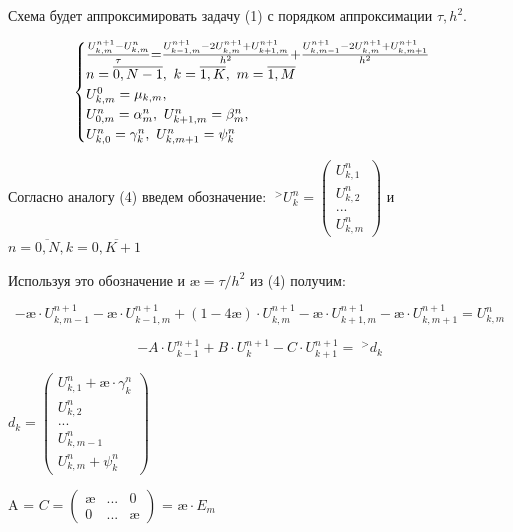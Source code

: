 \documentclass[__main__.tex]{subfiles}
\begin{document}
Схема будет аппроксимировать задачу (1) с порядком аппроксимации $ \tau, h^2 $.

\begin{equation} \label{50.4}
\begin{cases}
$$\frac{U^{n+1}_{k,m} - U^{n}_{k,m}}{\tau}$$ = $$\frac{U^{n+1}_{k-1,m} - 2U^{n+1}_{k,m} + U^{n+1}_{k+1,m}}{h^2}$$ + $$\frac{U^{n+1}_{k,m-1} - 2U^{n+1}_{k,m} + U^{n+1}_{k,m+1}}{h^2}$$ \\
n = \overline{0,N-1}, \ k = \overline{1,K}, \ m = \overline{1,M} \\
U^0_{k,m} = \mu_{k,m}, \\ 
U^n_{0,m} = \alpha^n_{m}, \ U^n_{k+1,m} = \beta^n_{m}, \\
U^n_{k,0} = \gamma^n_{k}, \ U^n_{k,m+1} = \psi^n_{k}
\end{cases}
\end{equation}

Согласно аналогу (4) введем обозначение: $\;^{>}U^n_k = \left(
\begin{matrix}
U^n_{k,1}  \\
U^n_{k,2}   \\
...  \\
U^n_{k,m}  
\end{matrix}
\right)$ и $n = \overline{0,N}, k = \overline{0,K+1}$

Используя это обозначение и $\text{\ae} = \tau/h^2$ из (4) получим:

\begin{equation}\label{50.5}
-\text{\ae} \cdot U^{n+1}_{k,m-1} - \text{\ae} \cdot U^{n+1}_{k-1,m} + (1 - 4\text{\ae}) \cdot U^{n+1}_{k,m} - \text{\ae} \cdot U^{n+1}_{k+1,m} - \text{\ae} \cdot U^{n+1}_{k,m+1} = U^{n}_{k,m}
\end{equation}

\begin{equation}\label{50.6}
-A \cdot U^{n+1}_{k-1} + B \cdot U^{n+1}_{k} - C \cdot U^{n+1}_{k+1} = \;^{>}d_k
\end{equation}

$d_k = \left(
\begin{matrix}
U^n_{k,1} + \text{\ae} \cdot \gamma^n_{k} \\
U^n_{k,2}   \\
...  \\
U^n_{k,m-1} \\
U^n_{k,m} + \psi^n_{k} 
\end{matrix}
\right)$

A = $C = \left(
\begin{matrix}
\text{\ae} & ... & 0 \\
0 &... & \text{\ae}
\end{matrix}
\right)$ = $\text{\ae} \cdot E_m$
\end{document}

